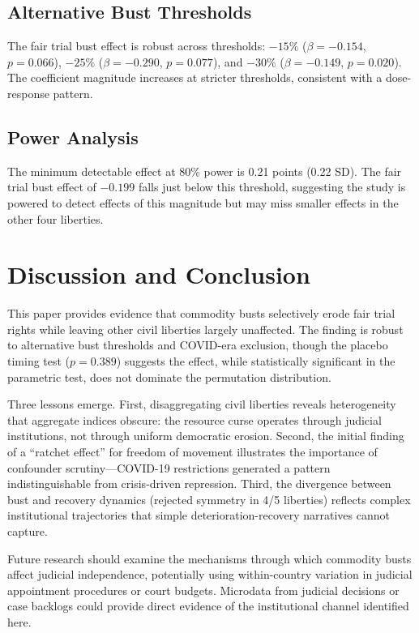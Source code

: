 \documentclass[12pt]{article}
\begin{document}
\subsection{Alternative Bust Thresholds}

The fair trial bust effect is robust across thresholds: $-15\%$ ($\beta = -0.154$, $p = 0.066$), $-25\%$ ($\beta = -0.290$, $p = 0.077$), and $-30\%$ ($\beta = -0.149$, $p = 0.020$). The coefficient magnitude increases at stricter thresholds, consistent with a dose-response pattern.

\subsection{Power Analysis}

The minimum detectable effect at 80\% power is 0.21 points (0.22 SD). The fair trial bust effect of $-0.199$ falls just below this threshold, suggesting the study is powered to detect effects of this magnitude but may miss smaller effects in the other four liberties.

\section{Discussion and Conclusion}

This paper provides evidence that commodity busts selectively erode fair trial rights while leaving other civil liberties largely unaffected. The finding is robust to alternative bust thresholds and COVID-era exclusion, though the placebo timing test ($p = 0.389$) suggests the effect, while statistically significant in the parametric test, does not dominate the permutation distribution.

Three lessons emerge. First, disaggregating civil liberties reveals heterogeneity that aggregate indices obscure: the resource curse operates through judicial institutions, not through uniform democratic erosion. Second, the initial finding of a ``ratchet effect'' for freedom of movement illustrates the importance of confounder scrutiny---COVID-19 restrictions generated a pattern indistinguishable from crisis-driven repression. Third, the divergence between bust and recovery dynamics (rejected symmetry in 4/5 liberties) reflects complex institutional trajectories that simple deterioration-recovery narratives cannot capture.

Future research should examine the mechanisms through which commodity busts affect judicial independence, potentially using within-country variation in judicial appointment procedures or court budgets. Microdata from judicial decisions or case backlogs could provide direct evidence of the institutional channel identified here.


\end{document}

